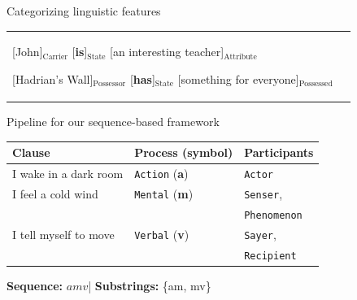 \documentclass[handout,10pt]{beamer}
\begin{document}
\begin{frame}{Categorizing linguistic features}
\begin{table}[!htb]
{\begin{tabular}{p{4cm}|p{11cm}}
        [John]$_{\text{Carrier}}$ [\textbf{is}]$_{\text{State}}$ [an interesting teacher]$_{\text{Attribute}}$ \newline
        
        [Hadrian's Wall]$_{\text{Possessor}}$ [\textbf{has}]$_{\text{State}}$ [something for everyone]$_{\text{Possessed}}$ \\ %
    \end{tabular}}
    \label{tab:process_participants}
\end{table}
    
\end{frame}

\begin{frame}{Pipeline for our sequence-based framework}


\begin{table}[!ht]
  \centering
  \small
  \renewcommand{\arraystretch}{1.1}
  \begin{threeparttable}
    \label{tab:example}
    \begin{tabular}{lll}
      \textbf{Clause} & \textbf{Process (symbol)} & \textbf{Participants} \\
      \midrule
      I wake in a dark room         & \texttt{Action} (\textbf{a})  & \texttt{Actor} \\
      I feel a cold wind            & \texttt{Mental} (\textbf{m})  & \texttt{Senser},\\
                                            &             & \texttt{Phenomenon} \\
      I tell myself to move         & \texttt{Verbal} (\textbf{v})  & \texttt{Sayer},\\
                                            &             & \texttt{Recipient} \\
      \bottomrule
    \end{tabular}

    \begin{tablenotes}[flushleft]
      \footnotesize
      \item \textbf{Sequence:} $amv$\quad|\quad
            \textbf{Substrings:} \{am, mv\}
    \end{tablenotes}
  \end{threeparttable}
\end{table}


\end{frame}
\end{document}
